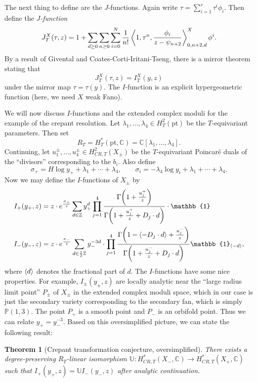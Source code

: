 \documentclass[leqno, openany]{memoir}
\newtheorem{thm}{Theorem}[section]
\theoremstyle{definition}
\theoremstyle{remark}
\theoremstyle{plain}
\theoremstyle{definition}
\theoremstyle{remark}
\newcommand{\C}{\mathbb{C}}
\newcommand{\Z}{\mathbb{Z}}
\renewcommand{\P}{\mathbb{P}}
\newcommand{\mr}[1]{\mathrm{#1}}
\begin{document}
The next thing to define are the $J$-functions. Again write $\tau = \sum_{i=1}^r \tau^i \phi_i$. Then define the \textit{$J$-function}
\[ J_T^X(\tau, z) = 1 + \sum_{d \geq 0} \sum_{n \geq 0} \sum_{i=0}^N \frac{1}{n!} \ev{1, \tau^n, \frac{\phi_i}{z - \psi_{n+2}}}_{0, n+2, d}^X \phi^i. \]
By a result of Givental and Coates-Corti-Iritani-Tseng, there is a mirror theorem stating that
\[ J_T^X(\tau, z) = I_T^X(y, z) \]
under the mirror map $\tau = \tau(y)$. The $I$-function is an explicit hypergeometric function (here, we need $X$ weak Fano).

We will now discuss $I$-functions and the extended complex moduli for the example of the crepant resolution. Let $\lambda_1, \ldots, \lambda_4 \in H_T^2(\mr{pt})$ be the $T$-equivariant parameters. Then set 
\[R_T = H_T^*(\mr{pt}, \C) = \C[\lambda_1, \ldots, \lambda_4]. \]
Continuing, let $u_1^{\pm}, \ldots, u_4^{\pm} \in H^2_{CR, T}(X_{\pm})$ be the $T$-equivariant Poincar\'e duals of the ``divisors'' corresponding to the $b_i$. Also define
\[ \sigma_+ = H \log y_+ + \lambda_1 + \cdots + \lambda_4, \qquad \sigma_i = -\lambda_4 \log y_i + \lambda_1 + \cdots + \lambda_4. \]
Now we may define the $I$-functions of $X_{\pm}$ by
\begin{align*}
    I_+(y_+, z) &= z \cdot e^{\frac{\sigma_+}{z}} \sum_{d \in \Z} y_+^d \prod_{j=1}^4 \frac{\Gamma\qty(1+\frac{u_j^+}{z})}{\Gamma\qty(1 + \frac{u_j^+}{z} + D_j \cdot d)} \cdot \mathbb{1} \\
    I_-(y_-, z) &= z \cdot e^{\frac{\sigma_-}{z}} \sum_{d \in \frac{1}{3}\Z} y_-^{-3d} \cdot \prod_{j=1}^4 \frac{\Gamma\qty(1-\ev{-D_j \cdot d} + \frac{u_j^-}{z})}{\Gamma\qty(1 + \frac{u_j^-}{z}+D_j \cdot d)}  \mathbb{1}_{\ev{-d}},
\end{align*}
where $\ev{d}$ denotes the fractional part of $d$. The $I$-functions have some nice properties. For example, $I_{\pm}(y_{\pm}, z)$ are locally analytic near the ``large radius limit point'' $P_{\pm}$ of $X_{\pm}$ in the extended complex moduli space, which in our case is just the secondary variety corresponding to the secondary fan, which is simply $\P(1,3)$. The point $P_+$ is a smooth point and $P_-$ is an orbifold point. Thus we can relate $y_+ = y_-^{-3}$. Based on this oversimplified picture, we can state the following result:

\begin{thm}[Crepant transformation conjecture, oversimplified]
    There exists a degree-preserving $R_T$-linear isomorphism $\mathbb{U} \colon H^*_{CR, T}(X_-, \C) \to H^*_{CR, T}(X_+, \C)$ such that $I_+(y_+, z) = \mathbb{U} I_-(y_-, z)$ after analytic continuation.
\end{thm}
\end{document}
